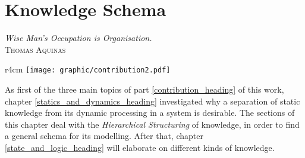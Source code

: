 %
%
%
%
%
%
%

\chapter{Knowledge Schema}
\label{knowledge_schema_heading}

\begin{flushright}
    \textsl{Wise Man's Occupation is Organisation.}\\
    \textsc{Thomas Aquinas}
\end{flushright}

\begin{wrapfigure}[7]{r}{4cm}
    \texttt{[image: graphic/contribution2.pdf]}
\end{wrapfigure}

As first of the three main topics of part \ref{contribution_heading} of this
work, chapter \ref{statics_and_dynamics_heading} investigated why a separation
of static knowledge from its dynamic processing in a system is desirable. The
sections of this chapter deal with the \emph{Hierarchical Structuring} of
knowledge, in order to find a general schema for its modelling. After that,
chapter \ref{state_and_logic_heading} will elaborate on different kinds of
knowledge.
\vspace{1cm}




